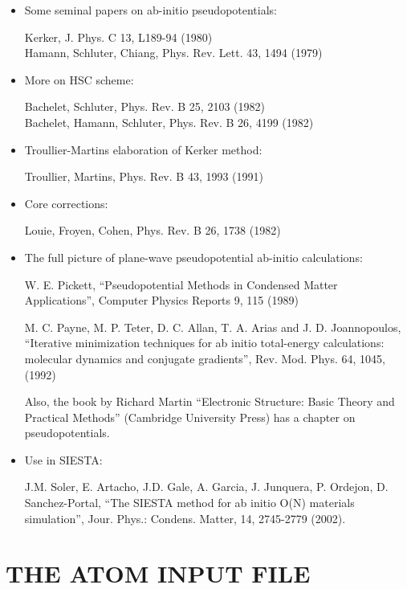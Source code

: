 \documentclass[11pt]{article}
\begin{document}
\begin{itemize}
\item Some seminal papers on ab-initio pseudopotentials:

Kerker, J. Phys. C 13, L189-94 (1980)\\
Hamann, Schluter, Chiang, Phys. Rev. Lett. 43, 1494 (1979)

\item More on HSC scheme:

Bachelet, Schluter, Phys. Rev. B 25, 2103 (1982)\\
Bachelet, Hamann, Schluter, Phys. Rev. B 26, 4199 (1982)

\item Troullier-Martins elaboration of Kerker method:

Troullier, Martins, Phys. Rev. B 43, 1993 (1991)\\

\item Core corrections:

Louie, Froyen, Cohen, Phys. Rev. B 26, 1738 (1982)

\item The full picture of plane-wave pseudopotential ab-initio calculations:

W. E. Pickett, ``Pseudopotential Methods in Condensed Matter
Applications'', Computer Physics Reports 9, 115 (1989)

M. C. Payne, M. P. Teter, D. C. Allan, T. A. Arias and
J. D. Joannopoulos, ``Iterative minimization techniques for ab initio
total-energy calculations: molecular dynamics and conjugate
gradients'', Rev. Mod. Phys. 64, 1045, (1992)

Also, the book by Richard Martin
``Electronic Structure: Basic Theory and Practical Methods''
(Cambridge University Press) has a chapter on pseudopotentials.

\item Use in \textsc{SIESTA}:

J.M. Soler, E. Artacho, J.D. Gale, A. Garcia, J. Junquera, P. Ordejon,
D. Sanchez-Portal, ``The SIESTA method for ab initio O(N)
materials simulation'', Jour. Phys.: Condens. Matter, 14, 2745-2779
(2002).

\end{itemize}



\section{THE ATOM INPUT FILE}
\end{document}
